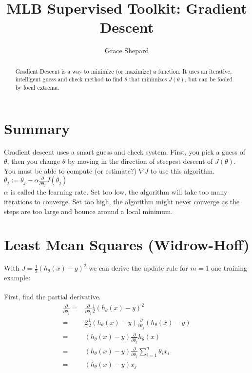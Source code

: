 \documentclass{article}
\begin{document}
\title{MLB Supervised Toolkit: Gradient Descent}
\author{Grace Shepard}

\maketitle

\begin{abstract}
    Gradient Descent is a way to minimize (or maximize) a function. It uses an iterative, intelligent guess and check method to find $\theta$ that minimizes $J(\theta)$, but can be fooled by local extrema.
\end{abstract}

\section{Summary}
Gradient descent uses a smart guess and check system. First, you pick a guess of $\theta$, then you change $\theta$ by moving in the direction of steepest descent of $J(\theta)$. You must be able to compute (or estimate?) $\nabla J$ to use this algorithm. \\

$\theta_j := \theta_j - \alpha \frac{\partial}{\partial \theta_j}J(\theta_j)$\\

$\alpha$ is called the learning rate. Set too low, the algorithm will take too many iterations to converge. Set too high, the algorithm might never converge as the steps are too large and bounce around a local minimum.\\

\section{Least Mean Squares (Widrow-Hoff)}
With $J=\frac{1}{2}{(h_\theta(x)-y)}^2$ we can derive the update rule for $m=1$ one training example:\\
\\
First, find the partial derivative.\\

\begin{align*}
\frac{\partial}{\partial \theta_j} =& \frac{\partial}{\partial \theta_j} \frac{1}{2}{(h_\theta(x) - y)}^2 \\
%
    =& 2\frac{1}{2}(h_\theta(x) - y) \frac{\partial}{\partial \theta_j}(h_\theta(x) - y) \\
%
    =& (h_\theta(x) - y) \frac{\partial}{\partial \theta_j}h_\theta(x) \\
%
    =& (h_\theta(x) - y) \frac{\partial}{\partial \theta_j}\sum_{i=1}^n\theta_ix_i\\
%
    =& (h_\theta(x) - y)x_j
\end{align*}
\end{document}
